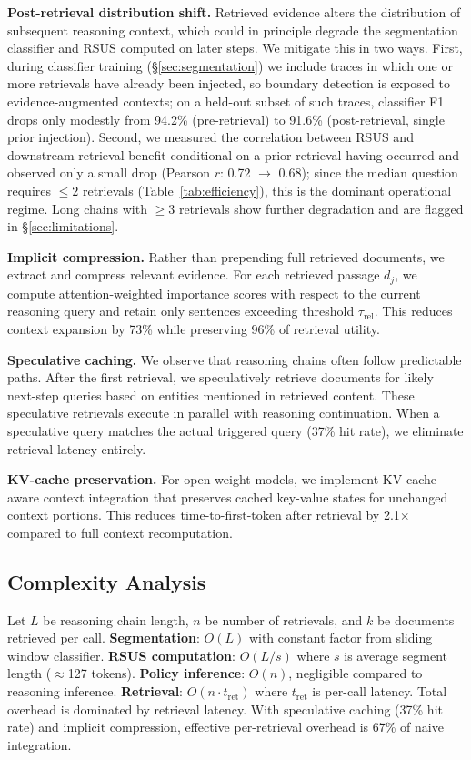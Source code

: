 \documentclass[sigconf,natbib=true]{acmart}
\begin{document}
\textbf{Post-retrieval distribution shift.}
Retrieved evidence alters the distribution of subsequent reasoning context, which could in principle degrade the segmentation classifier and RSUS computed on later steps. We mitigate this in two ways. First, during classifier training (\S\ref{sec:segmentation}) we include traces in which one or more retrievals have already been injected, so boundary detection is exposed to evidence-augmented contexts; on a held-out subset of such traces, classifier F1 drops only modestly from 94.2\% (pre-retrieval) to 91.6\% (post-retrieval, single prior injection). Second, we measured the correlation between RSUS and downstream retrieval benefit conditional on a prior retrieval having occurred and observed only a small drop (Pearson $r$: 0.72 $\rightarrow$ 0.68); since the median question requires $\le 2$ retrievals (Table~\ref{tab:efficiency}), this is the dominant operational regime. Long chains with $\ge 3$ retrievals show further degradation and are flagged in \S\ref{sec:limitations}.

\textbf{Implicit compression.}
Rather than prepending full retrieved documents, we extract and compress relevant evidence. For each retrieved passage $d_j$, we compute attention-weighted importance scores with respect to the current reasoning query and retain only sentences exceeding threshold $\tau_{\text{rel}}$. This reduces context expansion by 73\% while preserving 96\% of retrieval utility.

\textbf{Speculative caching.}
We observe that reasoning chains often follow predictable paths. After the first retrieval, we speculatively retrieve documents for likely next-step queries based on entities mentioned in retrieved content. These speculative retrievals execute in parallel with reasoning continuation. When a speculative query matches the actual triggered query (37\% hit rate), we eliminate retrieval latency entirely.

\textbf{KV-cache preservation.}
For open-weight models, we implement KV-cache-aware context integration that preserves cached key-value states for unchanged context portions. This reduces time-to-first-token after retrieval by 2.1$\times$ compared to full context recomputation.

\subsection{Complexity Analysis}
Let $L$ be reasoning chain length, $n$ be number of retrievals, and $k$ be documents retrieved per call. \textbf{Segmentation}: $O(L)$ with constant factor from sliding window classifier. \textbf{RSUS computation}: $O(L/s)$ where $s$ is average segment length ($\approx$127 tokens). \textbf{Policy inference}: $O(n)$, negligible compared to reasoning inference. \textbf{Retrieval}: $O(n \cdot t_{\text{ret}})$ where $t_{\text{ret}}$ is per-call latency. Total overhead is dominated by retrieval latency. With speculative caching (37\% hit rate) and implicit compression, effective per-retrieval overhead is 67\% of naive integration.
\end{document}
